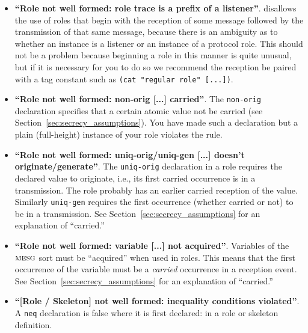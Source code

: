 \begin{itemize}
\item \textbf{``Role not well formed: role trace is a prefix of a
    listener''}.  {\cpsa} disallows the use of roles that begin with
  the reception of some message followed by the transmission of that
  same message, because there is an ambiguity as to whether an
  instance is a listener or an instance of a protocol role.  This
  should not be a problem because beginning a role in this manner is
  quite unusual, but if it is necessary for you to do so we recommend
  the reception be paired with a tag constant such as \texttt{(cat
    "regular role" [...])}.

\item \textbf{``Role not well formed: non-orig [...] carried''}.  The
  \texttt{non-orig} declaration specifies that a certain atomic value
  not be carried (see Section~\ref{sec:secrecy_assumptions}).  You
  have made such a declaration but a plain (full-height) instance of
  your role violates the rule.

\item \textbf{``Role not well formed: uniq-orig/uniq-gen [...] doesn't
    originate/generate''}. The \texttt{uniq-orig} declaration in a
  role requires the declared value to originate, i.e., its first
  carried occurrence is in a transmission. The role probably has an
  earlier carried reception of the value. Similarly \texttt{uniq-gen}
  requires the first occurrence (whether carried or not) to be in a
  transmission. See Section~\ref{sec:secrecy_assumptions} for an
  explanation of ``carried.''

\item \textbf{``Role not well formed: variable [...] not acquired''}.
  Variables of the $\scap{mesg}$ sort must be ``acquired'' when used
  in roles.  This means that the first occurrence of the variable must
  be a \emph{carried} occurrence in a reception event.  See
Section~\ref{sec:secrecy_assumptions} for an explanation of
``carried.''


\item \textbf{``[Role / Skeleton] not well formed: inequality
    conditions violated''}.  A \texttt{neq} declaration is false where
  it is first declared: in a role or skeleton definition.


\end{itemize}
